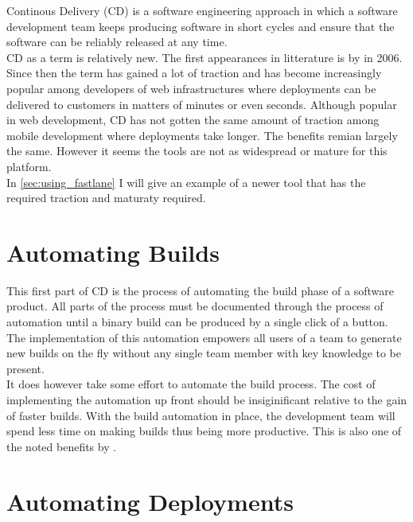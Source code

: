 \documentclass{ituthesis}
\begin{document}
Continous Delivery (CD) is a software engineering approach in which a software development team keeps producing software in short cycles and ensure that the software can be reliably released at any time. \cite{Chen2015}\\

CD as a term is relatively new. The first appearances in litterature is by \cite{Humble2006} in 2006. Since then the term has gained a lot of traction and has become increasingly popular among developers of web infrastructures where deployments can be delivered to customers in matters of minutes or even seconds. Although popular in web development, CD has not gotten the same amount of traction among mobile development where deployments take longer. The benefits remian largely the same. However it seems the tools are not as widespread or mature for this platform.\\

In \autoref{sec:using_fastlane} I will give an example of a newer tool that has the required traction and maturaty required.


\section{Automating Builds}

This first part of CD is the process of automating the build phase of a software product. All parts of the process must be documented through the process of automation \cite{Osterweil1997} until a binary build can be produced by a single click of a button. The implementation of this automation empowers all users of a team to generate new builds on the fly without any single team member with key knowledge to be present.\\

It does however take some effort to automate the build process. The cost of implementing the automation up front should be insiginificant relative to the gain of faster builds. With the build automation in place, the development team will spend less time on making builds thus being more productive. This is also one of the noted benefits by \cite{Chen2015}.

\section{Automating Deployments}
\end{document}
